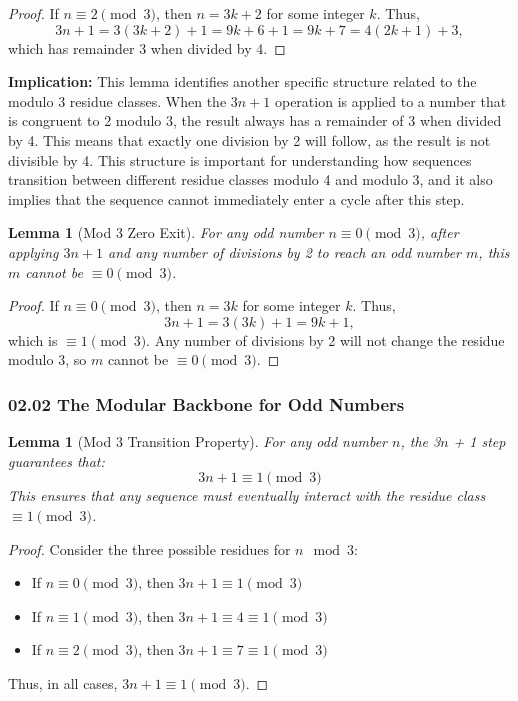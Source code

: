 \documentclass[11pt]{article}
\newtheorem{lemma}[theorem]{Lemma}
\begin{document}
\begin{proof}
If \(n \equiv 2 \pmod{3}\), then \(n = 3k + 2\) for some integer \(k\). Thus,
\[
3n + 1 = 3(3k + 2) + 1 = 9k + 6 + 1 = 9k + 7 = 4(2k + 1) + 3,
\]
which has remainder 3 when divided by 4.
\end{proof}

\textbf{Implication:} This lemma identifies another specific structure related to the modulo 3 residue classes. When the \(3n+1\) operation is applied to a number that is congruent to 2 modulo 3, the result always has a remainder of 3 when divided by 4. This means that exactly one division by 2 will follow, as the result is not divisible by 4. This structure is important for understanding how sequences transition between different residue classes modulo 4 and modulo 3, and it also implies that the sequence cannot immediately enter a cycle after this step.

\begin{lemma}[Mod 3 Zero Exit]
For any odd number \(n \equiv 0 \pmod{3}\), after applying \(3n+1\) and any number of divisions by 2 to reach an odd number \(m\), this \(m\) cannot be \(\equiv 0 \pmod{3}\).
\end{lemma}

\begin{proof}
If \(n \equiv 0 \pmod{3}\), then \(n = 3k\) for some integer \(k\). Thus,
\[
3n + 1 = 3(3k) + 1 = 9k + 1,
\]
which is \(\equiv 1 \pmod{3}\). Any number of divisions by 2 will not change the residue modulo 3, so \(m\) cannot be \(\equiv 0 \pmod{3}\).
\end{proof}

\subsubsection*{02.02 The Modular Backbone for Odd Numbers}

\begin{lemma}[Mod 3 Transition Property]
For any odd number \( n \), the 3\( n \) + 1 step guarantees that:
\[
3n + 1 \equiv 1 \pmod{3}
\]
This ensures that any sequence must eventually interact with the residue class \( \equiv 1 \pmod{3} \).
\end{lemma}

\begin{proof}
Consider the three possible residues for \( n \mod 3 \):
\begin{itemize}
    \item If \( n \equiv 0 \pmod{3} \), then \( 3n + 1 \equiv 1 \pmod{3} \)
    \item If \( n \equiv 1 \pmod{3} \), then \( 3n + 1 \equiv 4 \equiv 1 \pmod{3} \)
    \item If \( n \equiv 2 \pmod{3} \), then \( 3n + 1 \equiv 7 \equiv 1 \pmod{3} \)
\end{itemize}
Thus, in all cases, \( 3n + 1 \equiv 1 \pmod{3} \).
\end{proof}
\end{document}
